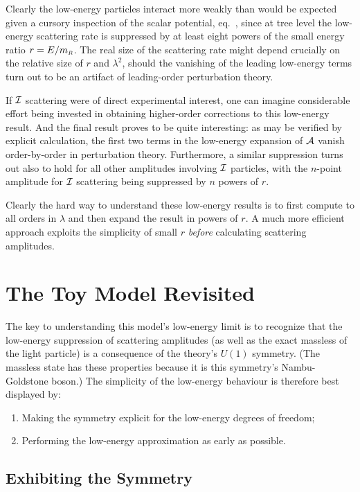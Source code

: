 Clearly the low-energy particles interact more weakly than
would be expected given a cursory inspection of the scalar
potential, eq.~, since at tree level 
the low-energy scattering rate is suppressed by 
at least eight powers of the small energy ratio $r = E/m_{\scriptscriptstyle R}$. 
The real size of the scattering rate might depend crucially
on the relative size of $r$ and $\lambda^2$, should the vanishing
of the leading low-energy terms turn out to be an artifact
of leading-order perturbation theory. 

If ${\cal I}$ scattering were of direct experimental interest, 
one can imagine considerable effort being invested in obtaining
higher-order corrections to this low-energy result. And the
final result proves to be quite interesting: as may be verified by 
explicit calculation, the first two terms in the low-energy
expansion of ${\cal A}$ vanish order-by-order in perturbation theory. 
Furthermore, a similar suppression turns out also to hold 
for all other amplitudes involving ${\cal I}$ particles, with
the $n$-point amplitude for ${\cal I}$ scattering being
suppressed by $n$ powers of $r$. 

Clearly the hard way to understand these low-energy
results is to first compute to all orders in $\lambda$ and 
then expand the result in powers of $r$. A much more
efficient approach exploits the simplicity of small $r$
{\sl before} calculating scattering amplitudes. 

\section{The Toy Model Revisited}

The key to understanding this model's low-energy limit
is to recognize that the low-energy suppression of
scattering amplitudes (as well as the exact massless of
the light particle) is a consequence of the theory's
$U(1)$ symmetry. (The massless state has these
properties because it is this symmetry's
Nambu-Goldstone boson.\cite{ChiPT,GBreviews}) 
The simplicity of the low-energy
behaviour is therefore best displayed by:

\begin{enumerate}
\item
Making the symmetry explicit for the low-energy
degrees of freedom;
%
\item
Performing the low-energy approximation as early as
possible.
%
\end{enumerate}

\subsection{Exhibiting the Symmetry}

